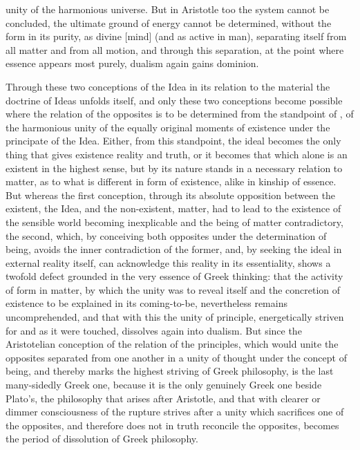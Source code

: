 unity of the harmonious universe. But in Aristotle too the system cannot be concluded, the ultimate ground of energy cannot be determined, without the form in its purity, as divine  [mind] (and as active  in man), separating itself from all matter and from all motion, and through this separation, at the point where essence appears most purely, dualism again gains dominion.

Through these two conceptions of the Idea in its relation to the material the doctrine of Ideas unfolds itself, and only these two conceptions become possible where the relation of the opposites is to be determined from the standpoint of , of the harmonious unity of the equally original moments of existence under the principate of the Idea. Either, from this standpoint, the ideal becomes the only thing that gives existence reality and truth, or it becomes that which alone is an existent in the highest sense, but by its nature stands in a necessary relation to matter, as to what is different in form of existence, alike in kinship of essence. But whereas the first conception, through its absolute opposition between the existent, the Idea, and the non-existent, matter, had to lead to the existence of the sensible world becoming inexplicable and the being of matter contradictory, the second, which, by conceiving both opposites under the determination of being, avoids the inner contradiction of the former, and, by seeking the ideal in external reality itself, can acknowledge this reality in its essentiality, shows a twofold defect grounded in the very essence of Greek thinking: that the activity of form in matter, by which the unity was to reveal itself and the concretion of existence to be explained in its coming-to-be, nevertheless remains uncomprehended, and that with this the unity of principle, energetically striven for and as it were touched, dissolves again into dualism. But since the Aristotelian conception of the relation of the principles, which would unite the opposites separated from one another in a unity of thought under the concept of being, and thereby marks the highest striving of Greek philosophy, is the last many-sidedly Greek one, because it is the only genuinely Greek one beside Plato's, the philosophy that arises after Aristotle, and that with clearer or dimmer consciousness of the rupture strives after a unity which sacrifices one of the opposites, and therefore does not in truth reconcile the opposites, becomes the period of dissolution of Greek philosophy.

